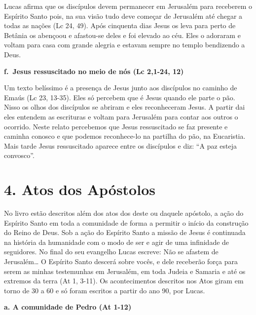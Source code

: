 \documentclass[
]{book}
\begin{document}
Lucas afirma que os discípulos devem permanecer em Jerusalém para receberem o Espírito Santo pois, na sua visão tudo deve começar de Jerusalém até chegar a todas as nações (Lc 24, 49). Após cinquenta dias Jesus os leva para perto de Betânia os abençoou e afastou-se deles e foi elevado ao céu. Eles o adoraram e voltam para casa com grande alegria e estavam sempre no templo bendizendo a Deus.

\textbf{f.~Jesus ressuscitado no meio de nós (Lc 2,1-24, 12)}

Um texto belíssimo é a presença de Jesus junto aos discípulos no caminho de Emaús (Lc 23, 13-35). Eles só percebem que é Jesus quando ele parte o pão. Nisso os olhos dos discípulos se abriram e eles reconheceram Jesus. A partir dai eles entendem as escrituras e voltam para Jerusalém para contar aos outros o ocorrido. Neste relato percebemos que Jesus ressuscitado se faz presente e caminha conosco e que podemos reconhece-lo na partilha do pão, na Eucaristia. Mais tarde Jesus ressuscitado aparece entre os discípulos e diz: ``A paz esteja convosco''.

\hypertarget{atos-dos-apuxf3stolos}{%
\section*{4. Atos dos Apóstolos}\label{atos-dos-apuxf3stolos}}

No livro estão descritos além dos atos dos deste ou daquele apóstolo, a ação do Espírito Santo em toda a comunidade de forma a permitir o início da construção do Reino de Deus. Sob a ação do Espírito Santo a missão de Jesus é continuada na história da humanidade com o modo de ser e agir de uma infinidade de seguidores. No final do seu evangelho Lucas escreve: Não se afastem de Jerusalém\ldots{} O Espírito Santo descerá sobre vocês, e dele receberão força para serem as minhas testemunhas em Jerusalém, em toda Judeia e Samaria e até os extremos da terra (At 1, 3-11). Os acontecimentos descritos nos Atos giram em torno de 30 a 60 e só foram escritos a partir do ano 90, por Lucas.

\textbf{a. A comunidade de Pedro (At 1-12)}
\end{document}
